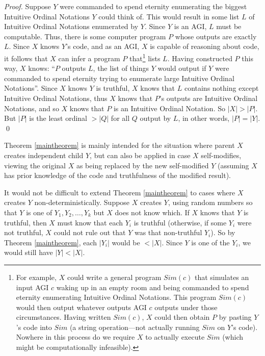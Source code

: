 \documentclass[runningheads]{llncs}
\begin{document}
\begin{proof}
    Suppose $Y$ were commanded to
    spend eternity enumerating the biggest Intuitive Ordinal Notations $Y$ could
    think of. This would result in some list $L$ of Intuitive Ordinal Notations
    enumerated by $Y$. Since $Y$ is an AGI, $L$ must be computable. Thus, there
    is some computer program
    $P$ whose outputs are exactly $L$.
    Since $X$ knows $Y$'s code,
    and as an AGI, $X$ is capable of reasoning about code,
    it follows that $X$ can infer a program $P$ that\footnote{For example,
    $X$ could write a general program $Sim(c)$ that simulates an input AGI $c$
    waking up in an empty room and being commanded
    to spend eternity enumerating Intuitive Ordinal Notations. This program $Sim(c)$
    would then output whatever outputs AGI $c$ outputs under those
    circumstances. Having written $Sim(c)$, $X$ could then obtain $P$ by
    pasting $Y$'s code into $Sim$ (a string operation---not actually running $Sim$
    on $Y$'s code).
    Nowhere in this process do we require $X$ to actually
    execute $Sim$ (which might be computationally infeasible).} lists $L$.
    Having constructed $P$ this way, $X$ knows: ``$P$ outputs
    $L$, the list of things $Y$ would output if $Y$ were commanded to spend eternity
    trying to enumerate large Intuitive Ordinal Notations''.
    Since $X$ knows $Y$ is truthful,
    $X$ knows that $L$ contains nothing except Intuitive Ordinal Notations,
    thus $X$ knows that $P$'s outputs are Intuitive Ordinal Notations,
    and so $X$ knows that $P$ is an Intuitive Ordinal Notation.
    So $|X|>|P|$. But $|P|$ is
    the least ordinal $>|Q|$ for all $Q$ output by $L$, in other words,
    $|P|=|Y|$.
    \qed
\end{proof}

Theorem \ref{maintheorem} is mainly intended for the situation where parent $X$ creates
independent child $Y$, but can also be applied in case $X$ self-modifies,
viewing the original $X$ as being replaced by the new self-modified
$Y$ (assuming $X$ has prior
knowledge of the code and truthfulness of the modified result).

It would not be difficult to extend Theorem \ref{maintheorem} to cases where $X$ creates
$Y$ non-deterministically. Suppose $X$ creates $Y$, using random numbers so that $Y$ is
one of $Y_1,Y_2,\ldots,Y_k$ but $X$ does not know which. If $X$ knows that $Y$ is truthful,
then $X$ must know that each $Y_i$ is truthful (otherwise, if some $Y_i$ were not truthful,
$X$ could not rule out that $Y$ was that non-truthful $Y_i$). So by Theorem \ref{maintheorem},
each $|Y_i|$ would be $<|X|$. Since $Y$ is one of the $Y_i$, we would still have
$|Y|<|X|$.
\end{document}
